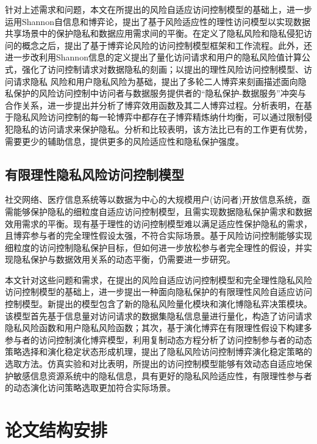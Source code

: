 针对上述需求和问题，本文在所提出的风险自适应访问控制模型的基础上，进一步运用Shannon自信息和博弈论，提出了基于风险适应性的理性访问模型以实现数据共享场景中的保护隐私和数据应用需求间的平衡。在定义了隐私风险和隐私侵犯访问的概念之后，提出了基于博弈论风险的访问控制模型框架和工作流程。此外，还进一步改利用Shannon信息的定义提出了量化访问请求和用户的隐私风险值计算公式，强化了访问控制请求对数据隐私的刻画；以提出的理性风险访问控制模型、访问请求隐私 风险和用户隐私风险为基础，提出了多轮二人博弈来刻画描述面向隐私保护的风险访问控制中访问者与数据服务提供者的“隐私保护-数据服务”冲突与合作关系，进一步提出并分析了博弈效用函数及其二人博弈过程。分析表明，在基于隐私风险访问控制的每一轮博弈中都存在子博弈精炼纳什均衡，可以通过限制侵犯隐私的访问请求来保护隐私。分析和比较表明，该方法比已有的工作更有优势，需要更少的辅助信息，提供更多的风险适应性和隐私保护强度。

\subsection{有限理性隐私风险访问控制模型}

社交网络、医疗信息系统等以数据为中心的大规模用户(访问者)开放信息系统，亟需能够保护隐私的细粒度自适应访问控制模型，且需实现数据隐私保护需求和数据效用需求的平衡。现有基于理性的访问控制模型难以满足适应性保护隐私的需求，且博弈参与者的完全理性假设太强，不符合实际场景。基于风险访问控制能够实现细粒度的访问控制隐私保护目标，但如何进一步放松参与者完全理性的假设，并实现隐私保护与数据效用关系的动态平衡，仍需要进一步研究。

本文针对这些问题和需求，在提出的风险自适应访问控制模型和完全理性隐私风险访问控制模型的基础上，进一步提出一种面向隐私保护的有限理性风险自适应访问控制模型。新提出的模型包含了新的隐私风险量化模块和演化博隐私弈决策模块。该模型首先基于信息量对访问请求的数据集隐私信息量进行量化，构造了访问请求隐私风险函数和用户隐私风险函数；其次，基于演化博弈在有限理性假设下构建多参与者的访问控制演化博弈模型，利用复制动态方程分析了访问控制参与者的动态策略选择和演化稳定状态形成机理，提出了隐私风险访问控制博弈演化稳定策略的选取方法。仿真实验和对比表明，所提出的访问控制模型能够有效动态自适应地保护敏感信息资源系统中的隐私信息，具有更好的隐私风险适应性，有限理性参与者的动态演化访问策略选取更加符合实际场景。

\section{论文结构安排}

